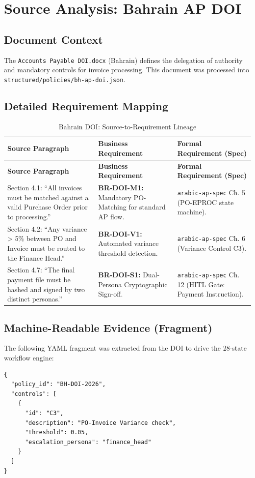 \chapter{Source Analysis: Bahrain AP DOI}
\label{ch:analysis-bh-doi}

\section{Document Context}
The \texttt{Accounts Payable DOI.docx} (Bahrain) defines the delegation of authority and mandatory controls for invoice processing. This document was processed into \texttt{structured/policies/bh-ap-doi.json}.

\section{Detailed Requirement Mapping}

\begin{longtable}{p{5cm} p{5cm} p{5cm}}
\caption{Bahrain DOI: Source-to-Requirement Lineage} \\
\toprule
\textbf{Source Paragraph} & \textbf{Business Requirement} & \textbf{Formal Requirement (Spec)} \\
\midrule
\endfirsthead
\toprule
\textbf{Source Paragraph} & \textbf{Business Requirement} & \textbf{Formal Requirement (Spec)} \\
\midrule
\endhead
Section 4.1: ``All invoices must be matched against a valid Purchase Order prior to processing.'' & \textbf{BR-DOI-M1:} Mandatory PO-Matching for standard AP flow. & \texttt{arabic-ap-spec} Ch. 5 (PO-EPROC state machine). \\
\midrule
Section 4.2: ``Any variance > 5\% between PO and Invoice must be routed to the Finance Head.'' & \textbf{BR-DOI-V1:} Automated variance threshold detection. & \texttt{arabic-ap-spec} Ch. 6 (Variance Control C3). \\
\midrule
Section 4.7: ``The final payment file must be hashed and signed by two distinct personas.'' & \textbf{BR-DOI-S1:} Dual-Persona Cryptographic Sign-off. & \texttt{arabic-ap-spec} Ch. 12 (HITL Gate: Payment Instruction). \\
\bottomrule
\end{longtable}

\section{Machine-Readable Evidence (Fragment)}
The following YAML fragment was extracted from the DOI to drive the 28-state workflow engine:

\begin{lstlisting}[language=jsonx]
{
  "policy_id": "BH-DOI-2026",
  "controls": [
    {
      "id": "C3",
      "description": "PO-Invoice Variance check",
      "threshold": 0.05,
      "escalation_persona": "finance_head"
    }
  ]
}
\end{lstlisting}
